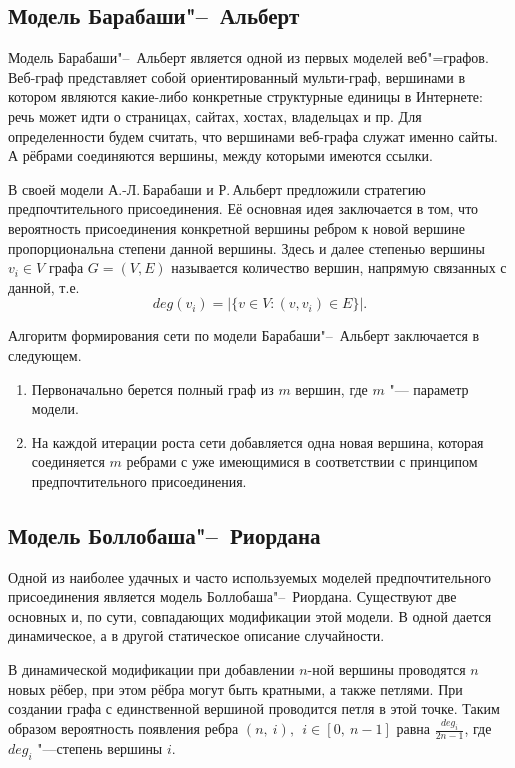 \documentclass[bachelor, och, diploma]{SCWorks}
\begin{document}
\subsection{Модель Барабаши"--~Альберт}
Модель Барабаши"--~Альберт является одной из первых моделей веб"=гра\-фов. Веб-граф представляет собой ориентированный мульти-граф, вершинами в котором являются какие-либо конкретные структурные единицы в Интернете: речь может идти о страницах, сайтах, хостах, владельцах и пр. Для определенности будем считать, что вершинами веб-графа служат именно сайты. А рёбрами соединяются вершины, между которыми имеются ссылки.

В своей модели А.-Л.\,Барабаши и Р.\,Альберт предложили стратегию предпочтительного присоединения\cite{BA}. Её основная идея  заключается в том, что вероятность присоединения конкретной вершины ребром к новой вершине пропорциональна степени данной вершины. Здесь и далее степенью вершины $v_i \in V$ графа $G = (V, E)$ называется количество вершин, напрямую связанных с данной, т.е. \[deg(v_i) = |\{v \in V: (v, v_i) \in E \}|.\] 

Алгоритм формирования сети по модели Барабаши"--~Альберт заключается в следующем.
\begin{enumerate}
\item Первоначально берется полный граф из $ m $ вершин, где $ m $ "--- параметр модели. 
\item На каждой итерации роста сети добавляется одна новая вершина, которая соединяется $ m $ ребрами с уже имеющимися в соответствии с принципом предпочтительного присоединения.
\end{enumerate}
 
\subsection{Модель Боллобаша"--~Риордана}
Одной из наиболее удачных и часто используемых моделей предпочтительного присоединения является модель Боллобаша"--~Риордана. Существуют две основных и, по сути, совпадающих модификации этой модели. В одной дается динамическое, а в другой статическое описание случайности\cite{rey1}.

В динамической модификации при добавлении $ n $-ной вершины проводятся $ n $ новых рёбер, при этом рёбра могут быть кратными, а также петлями. При создании графа с единственной вершиной проводится петля в этой точке\cite{rey2}. Таким образом вероятность появления ребра $ (n,\ i),\ \ i\in[0,\ n-1] $ равна $ \frac{deg_i}{2n-1} $, где $ deg_i $ "---степень вершины $i$. 
\end{document}
